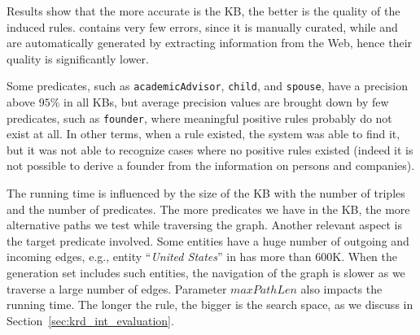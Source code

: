 Results show that the more accurate is the KB, the better is the quality of the induced rules. \wikidata contains very few errors, since it is manually curated, while
 \dbpedia and \yago are automatically generated by extracting information from the Web, hence their quality is significantly lower. 

Some predicates, such as \texttt{academicAdvisor}, \texttt{child}, and \texttt{spouse}, have a precision above $95\%$ in all KBs, but average precision values are brought down by few predicates, such as \texttt{founder}, where meaningful positive rules probably do not exist at all. In other terms, when a rule existed, the system was able to find it, but it was not able to recognize cases where no positive rules existed (indeed it is not possible to derive a founder from the information on persons and companies).  %

The running time is influenced by the size of the KB with the number of triples and the number of predicates. %
 The more predicates we have in the KB, the more alternative paths we test while traversing the graph.
Another relevant aspect is the target predicate involved. Some entities have a huge number of outgoing and incoming edges, e.g., entity ``\textit{United States}'' in \wikidata has more than $600$K. When the generation set includes such entities, the navigation of the graph is slower as we traverse a large number of edges. 
Parameter $maxPathLen$  also impacts the running time. The longer the rule, the bigger is the search space, as we discuss in Section~\ref{sec:krd_int_evaluation}. 


